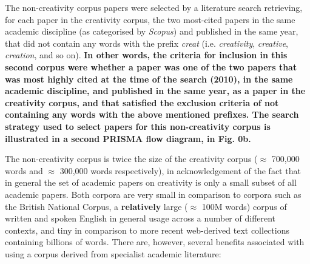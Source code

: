 \documentclass[10pt,letterpaper]{article}
\begin{document}
\vspace{0.25cm}
\begin{center}
\end{center}
\vspace{0.25cm}

The non-creativity corpus papers were selected by a literature search retrieving, for each paper in the creativity corpus, the two most-cited papers in the same academic discipline (as categorised by  {\em Scopus}) and published in the same year, that did not contain any words with the prefix {\em creat\/} (i.e. {\em creativity\/}, {\em creative\/}, {\em creation\/}, and so on). \textbf{In other words, the criteria for inclusion in this second corpus were whether a paper was one of the two papers that was most highly cited at the time of the search (2010), in the same academic discipline, and published in the same year, as a paper in the creativity corpus, and that satisfied the exclusion criteria of not containing any words with the above mentioned prefixes. The search strategy used to select papers for this non-creativity corpus is illustrated in a second PRISMA \cite{prisma09} flow diagram, in Fig. 0b. %
}


The non-creativity corpus is twice the size of the creativity corpus ($\approx$ 700,000 words and $\approx$ 300,000 words respectively), in acknowledgement of the fact that in general the set of academic papers on creativity is only a small subset of all academic papers. Both corpora are very small in comparison to corpora such as the British National Corpus, a \textbf{relatively} large  ($\approx$ 100M words) corpus of written and spoken English in general usage across a number of different contexts, and tiny in comparison to more recent web-derived text collections containing billions of words. There are, however, several benefits associated with using a corpus derived from specialist academic literature:
\end{document}
